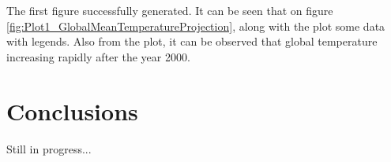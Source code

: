 \documentclass[12pt, letterpaper]{article}
\begin{document}
The first figure successfully generated. It can be seen that on figure \ref{fig:Plot1_GlobalMeanTemperatureProjection}, along with the plot some data with legends. Also from the plot, it can be observed that global temperature increasing rapidly after the year 2000. 












\section{Conclusions}
Still in progress...
\end{document}
